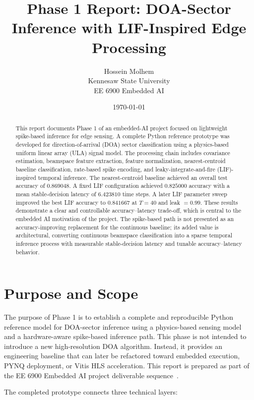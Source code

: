 \documentclass[11pt]{article}
\title{Phase 1 Report: DOA-Sector Inference with LIF-Inspired Edge Processing}
\author{Hossein Molhem\\Kennesaw State University\\EE 6900 Embedded AI}
\date{\today}
\begin{document}
\maketitle

\begin{abstract}
This report documents Phase 1 of an embedded-AI project focused on lightweight spike-based inference for edge sensing. A complete Python reference prototype was developed for direction-of-arrival (DOA) sector classification using a physics-based uniform linear array (ULA) signal model. The processing chain includes covariance estimation, beamspace feature extraction, feature normalization, nearest-centroid baseline classification, rate-based spike encoding, and leaky-integrate-and-fire (LIF)-inspired temporal inference. The nearest-centroid baseline achieved an overall test accuracy of $0.869048$. A fixed LIF configuration achieved $0.825000$ accuracy with a mean stable-decision latency of $6.423810$ time steps. A later LIF parameter sweep improved the best LIF accuracy to $0.841667$ at $T=40$ and leak $=0.99$. These results demonstrate a clear and controllable accuracy--latency trade-off, which is central to the embedded AI motivation of the project. The spike-based path is not presented as an accuracy-improving replacement for the continuous baseline; its added value is architectural, converting continuous beamspace classification into a sparse temporal inference process with measurable stable-decision latency and tunable accuracy--latency behavior.
\end{abstract}

\tableofcontents
\newpage

\section{Purpose and Scope}

The purpose of Phase 1 is to establish a complete and reproducible Python reference model for DOA-sector inference using a physics-based sensing model and a hardware-aware spike-based inference path. This phase is not intended to introduce a new high-resolution DOA algorithm. Instead, it provides an engineering baseline that can later be refactored toward embedded execution, PYNQ deployment, or Vitis HLS acceleration. This report is prepared as part of the EE 6900 Embedded AI project deliverable sequence~\cite{ee6900_phase1_project}.

The completed prototype connects three technical layers:
\end{document}
